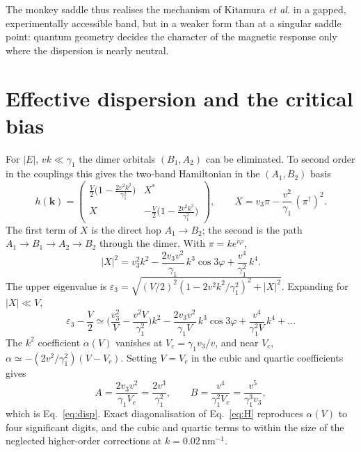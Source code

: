 \documentclass[12pt,a4paper]{article}
\newcommand{\bk}{\mathbf{k}}
\newcommand{\nm}{\,\mathrm{nm}}
\begin{document}
The monkey saddle thus realises the mechanism of Kitamura \emph{et al.} in a gapped, experimentally accessible band, but in a weaker form than at a singular saddle point: quantum geometry decides the character of the magnetic response only where the dispersion is nearly neutral.





\clearpage
\appendix
\section{Effective dispersion and the critical bias}\label{app:dispersion}

For $|E|,\,vk\ll\gamma_1$ the dimer orbitals $(B_1,A_2)$ can be eliminated. To second order in the couplings this gives the two-band Hamiltonian in the $(A_1,B_2)$ basis~\citep{McCann2013}
\begin{equation}
h(\bk)=\begin{pmatrix}\frac V2\Big(1-\frac{2v^2k^2}{\gamma_1^2}\Big) & X^*\\[3pt] X & -\frac V2\Big(1-\frac{2v^2k^2}{\gamma_1^2}\Big)\end{pmatrix},\qquad
X=v_3\pi-\frac{v^2}{\gamma_1}\,(\pi^\dagger)^2 .
\end{equation}
The first term of $X$ is the direct hop $A_1\to B_2$; the second is the path $A_1\to B_1\to A_2\to B_2$ through the dimer. With $\pi=ke^{i\varphi}$,
\begin{equation}
|X|^2=v_3^2k^2-\frac{2v_3v^2}{\gamma_1}\,k^3\cos3\varphi+\frac{v^4}{\gamma_1^2}\,k^4 .
\end{equation}
The upper eigenvalue is $\varepsilon_3=\sqrt{(V/2)^2(1-2v^2k^2/\gamma_1^2)^2+|X|^2}$. Expanding for $|X|\ll V$,
\begin{equation}
\varepsilon_3-\frac V2\simeq\Big(\frac{v_3^2}{V}-\frac{v^2V}{\gamma_1^2}\Big)k^2
-\frac{2v_3v^2}{\gamma_1V}\,k^3\cos3\varphi+\frac{v^4}{\gamma_1^2V}\,k^4+\dots
\end{equation}
The $k^2$ coefficient $\alpha(V)$ vanishes at $V_c=\gamma_1v_3/v$, and near $V_c$, $\alpha\simeq-(2v^2/\gamma_1^2)(V-V_c)$. Setting $V=V_c$ in the cubic and quartic coefficients gives
\begin{equation}
A=\frac{2v_3v^2}{\gamma_1V_c}=\frac{2v^3}{\gamma_1^2},\qquad B=\frac{v^4}{\gamma_1^2V_c}=\frac{v^5}{\gamma_1^3v_3},
\end{equation}
which is Eq.~\eqref{eq:disp}. Exact diagonalisation of Eq.~\eqref{eq:H} reproduces $\alpha(V)$ to four significant digits, and the cubic and quartic terms to within the size of the neglected higher-order corrections at $k=0.02\nm^{-1}$.
\end{document}
